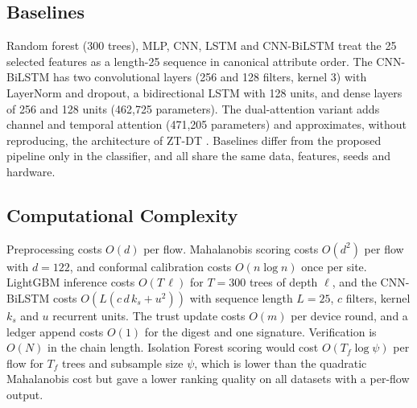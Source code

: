 \documentclass[journal]{IEEEtran}
\begin{document}
\subsection{Baselines}
Random forest (300 trees), MLP, CNN, LSTM and CNN-BiLSTM treat the 25 selected features as a length-25 sequence in canonical attribute order. The CNN-BiLSTM has two convolutional layers (256 and 128 filters, kernel 3) with LayerNorm and dropout, a bidirectional LSTM with 128 units, and dense layers of 256 and 128 units (462,725 parameters). The dual-attention variant adds channel and temporal attention (471,205 parameters) and approximates, without reproducing, the architecture of ZT-DT \cite{mishra2026zero}. Baselines differ from the proposed pipeline only in the classifier, and all share the same data, features, seeds and hardware.

\subsection{Computational Complexity}
Preprocessing costs $O(d)$ per flow. Mahalanobis scoring costs $O(d^{2})$ per flow with $d=122$, and conformal calibration costs $O(n\log n)$ once per site. LightGBM inference costs $O(T\,\ell)$ for $T=300$ trees of depth $\ell$, and the CNN-BiLSTM costs $O(L(c\,d\,k_s+u^{2}))$ with sequence length $L=25$, $c$ filters, kernel $k_s$ and $u$ recurrent units. The trust update costs $O(m)$ per device round, and a ledger append costs $O(1)$ for the digest and one signature. Verification is $O(N)$ in the chain length. Isolation Forest scoring would cost $O(T_f\log\psi)$ per flow for $T_f$ trees and subsample size $\psi$, which is lower than the quadratic Mahalanobis cost but gave a lower ranking quality on all datasets with a per-flow output.
\end{document}
